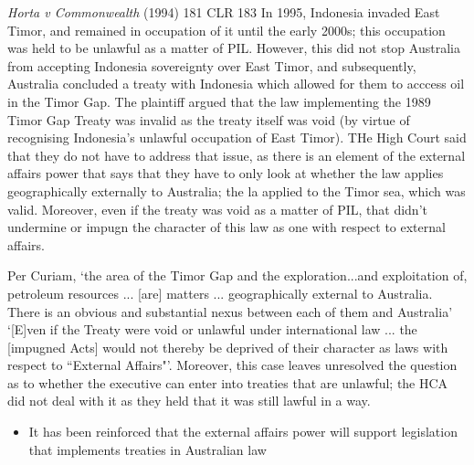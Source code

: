 \begin{casedetails}{\textit{Horta v Commonwealth} (1994) 181 CLR 183}\label{case:Horta v Commonwealth}
    \flushleft
    In 1995, Indonesia invaded East Timor, and remained in occupation of it until the early 2000s; this occupation was held to be unlawful as a matter of PIL. However, this did not stop Australia from accepting Indonesia sovereignty over East Timor, and subsequently, Australia concluded a treaty with Indonesia which allowed for them to acccess oil in the Timor Gap. The plaintiff argued that the law implementing the 1989 Timor Gap Treaty was invalid as the treaty itself was void (by virtue of recognising Indonesia's unlawful occupation of East Timor). THe High Court said that they do not have to address that issue, as there is an element of the external affairs power that says that they have to only look at whether the law applies geographically externally to Australia; the la applied to the Timor sea, which was valid. Moreover, even if the treaty was void as a matter of PIL, that didn't undermine or impugn the character of this law as one with respect to external affairs.

    \vspace{\baselineskip}

    Per Curiam, `the area of the Timor Gap and the exploration...and exploitation of, petroleum resources ... [are] matters ... geographically external to Australia. There is an obvious and substantial nexus between each of them and Australia' `[E]ven if the Treaty were void or unlawful under international law ... the [impugned Acts] would not thereby be deprived of their character as laws with respect to ``External Affairs"'. Moreover, this case leaves unresolved the question as to whether the executive can enter into treaties that are unlawful; the HCA did not deal with it as they held that it was still lawful in a way.
\end{casedetails}

\begin{itemize}
    \item It has been reinforced that the external affairs power will support legislation that implements treaties in Australian law
\end{itemize}

